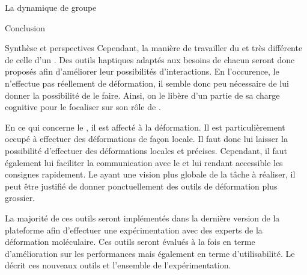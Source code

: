 \documentclass[myfrancais,ngerman,english,frenchb]{mythesis}
\begin{document}
\begin{mychapter}{La dynamique de groupe}
\begin{mysection}{Conclusion}
\begin{mysubsection}{Synthèse et perspectives}
				Cependant, la manière de travailler du  et très différente de celle d'un .
				Des outils haptiques adaptés aux besoins de chacun seront donc proposés afin d'améliorer leur possibilités d'interactions.
				En l'occurence, le  n'effectue pas réellement de déformation, il semble donc peu nécessaire de lui donner la possibilité de le faire.
				Ainsi, on le libère d'un partie de sa charge cognitive pour le focaliser sur son rôle de .

				En ce qui concerne le , il est affecté à la déformation.
				Il est particulièrement occupé à effectuer des déformations de façon locale.
				Il faut donc lui laisser la possibilité d'effectuer des déformations locales et précises.
				Cependant, il faut également lui faciliter la communication avec le  et lui rendant accessible les consignes rapidement.
				Le  ayant une vision plus globale de la tâche à réaliser, il peut être justifié de donner ponctuellement des outils de déformation plus grossier.

				La majorité de ces outils seront implémentés dans la dernière version de la plateforme afin d'effectuer une expérimentation avec des experts de la déformation moléculaire.
				Ces outils seront évalués à la fois en terme d'amélioration sur les performances mais également en terme d'utilisabilité.
				Le  décrit ces nouveaux outils et l'ensemble de l'expérimentation.
			\end{mysubsection}
		\end{mysection}
	\end{mychapter}
\end{document}
